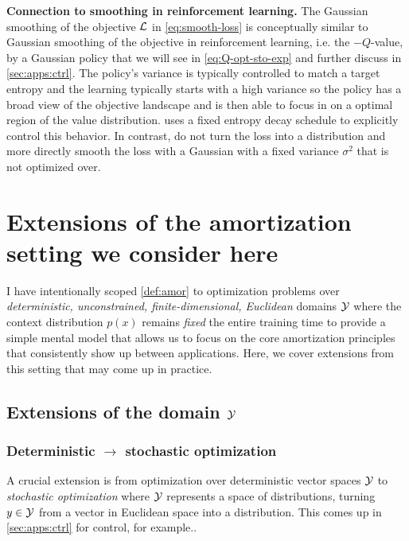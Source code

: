 \documentclass[twoside,11pt]{article}
\newcommand{\ie}{i.e.\xspace}
\begin{document}
\textbf{Connection to smoothing in reinforcement learning.}
The Gaussian smoothing of the objective ${\mathcal{L}}$ in \cref{eq:smooth-loss}
is conceptually similar to Gaussian smoothing of the
objective in reinforcement learning, \ie the $-Q$-value,
by a Gaussian policy that we will see in
\cref{eq:Q-opt-sto-exp} and further discuss
in \cref{sec:apps:ctrl}.
The policy's variance is typically controlled to match a
target entropy \citet{haarnoja2018soft} and the learning
typically starts with a high variance so the policy has a
broad view of the objective landscape and is then able to focus in
on a optimal region of the value distribution.
\citet{amos2021model} uses a fixed entropy decay schedule to
explicitly control this behavior.
In contrast, \citet{metz2019understanding,merchant2021learn2hop}
do not turn the loss into a distribution and more directly
smooth the loss with a Gaussian with a fixed variance $\sigma^2$
that is not optimized over.

\section{Extensions of the amortization setting we consider here}
\label{sec:extensions}

I have intentionally scoped \cref{def:amor} to optimization problems
over \emph{deterministic, unconstrained, finite-dimensional, Euclidean}
domains ${\mathcal{Y}}$ where the context distribution $p(x)$
remains \emph{fixed} the
entire training time to provide a simple mental model that
allows us to focus on the core amortization principles
that consistently show up between applications.
Here, we cover extensions from this setting that may come up in practice.

\subsection{Extensions of the domain ${\mathcal{Y}}$}
\label{sec:extensions:domain}
\subsubsection{Deterministic $\rightarrow$ stochastic optimization}
\label{sec:extensions:sto}
A crucial extension is from optimization over deterministic vector
spaces ${\mathcal{Y}}$ to \emph{stochastic optimization}
where ${\mathcal{Y}}$ represents a space of distributions,
turning $y\in{\mathcal{Y}}$ from a vector in Euclidean space
into a distribution.
This comes up in \cref{sec:apps:ctrl} for control,
for example..
\end{document}
